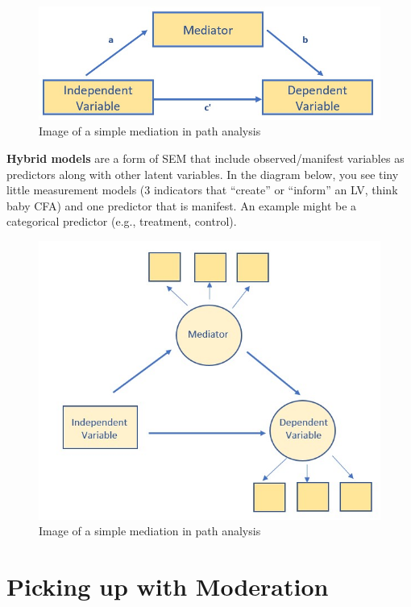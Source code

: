 \documentclass[
  english,
]{book}
\begin{document}
\begin{figure}
\centering
\includegraphics{images/SimpleMod/SimpleMed.jpg}
\caption{Image of a simple mediation in path analysis}
\end{figure}

\textbf{Hybrid models} are a form of SEM that include observed/manifest variables as predictors along with other latent variables. In the diagram below, you see tiny little measurement models (3 indicators that ``create'' or ``inform'' an LV, think baby CFA) and one predictor that is manifest. An example might be a categorical predictor (e.g., treatment, control).

\begin{figure}
\centering
\includegraphics{images/SimpleMod/HybridMed.jpg}
\caption{Image of a simple mediation in path analysis}
\end{figure}

\hypertarget{picking-up-with-moderation}{%
\section{Picking up with Moderation}\label{picking-up-with-moderation}}
\end{document}

